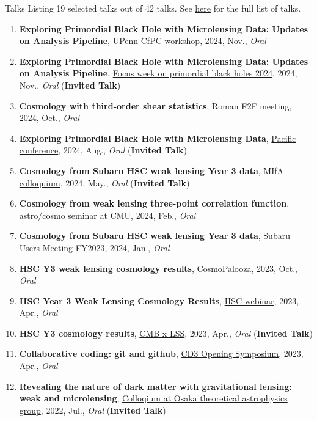 \begin{rSection}{Talks}
Listing 19 selected talks out of 42 talks.
See \href{https://github.com/git-sunao/cv/blob/main/en/sunao_type_list.pdf}{here} for the full list of talks.\begin{enumerate}
\item \textbf{Exploring Primordial Black Hole with Microlensing Data: Updates on Analysis Pipeline}, UPenn CfPC workshop, 2024, Nov., \textit{Oral}
\item \textbf{Exploring Primordial Black Hole with Microlensing Data: Updates on Analysis Pipeline}, \href{https://indico.ipmu.jp/event/439/overview}{Focus week on primordial black holes 2024}, 2024, Nov., \textit{Oral} (\textbf{Invited Talk})
\item \textbf{Cosmology with third-order shear statistics}, Roman F2F meeting, 2024, Oct., \textit{Oral}
\item \textbf{Exploring Primordial Black Hole with Microlensing Data}, \href{https://pacific-conference.pa.ucla.edu/index.html}{Pacific conference}, 2024, Aug., \textit{Oral} (\textbf{Invited Talk})
\item \textbf{Cosmology from Subaru HSC weak lensing Year 3 data}, \href{https://cse.umn.edu/physics/minnesota-institute-astrophysics-mifa-colloquium}{MIfA colloquium}, 2024, May., \textit{Oral} (\textbf{Invited Talk})
\item \textbf{Cosmology from weak lensing three-point correlation function}, astro/cosmo seminar at CMU, 2024, Feb., \textit{Oral}
\item \textbf{Cosmology from Subaru HSC weak lensing Year 3 data}, \href{https://www.subarutelescope.org/Science/SubaruUM/SubaruUM2023/index.html}{Subaru Users Meeting FY2023}, 2024, Jan., \textit{Oral}
\item \textbf{HSC Y3 weak lensing cosmology results}, \href{http://vietnam.in2p3.fr/2023/windows/index.html}{CosmoPalooza}, 2023, Oct., \textit{Oral}
\item \textbf{HSC Year 3 Weak Lensing Cosmology Results}, \href{https://hsc-release.mtk.nao.ac.jp/doc/index.php/wly3/}{HSC webinar}, 2023, Apr., \textit{Oral}
\item \textbf{HSC Y3 cosmology results}, \href{https://www2.yukawa.kyoto-u.ac.jp/~cmb-lss/index.php}{CMB x LSS}, 2023, Apr., \textit{Oral} (\textbf{Invited Talk})
\item \textbf{Collaborative coding: git and github}, \href{https://cd3.ipmu.jp/opening/}{CD3 Opening Symposium}, 2023, Apr., \textit{Oral}
\item \textbf{Revealing the nature of dark matter with gravitational lensing: weak and microlensing}, \href{http://astro-osaka.jp/OUTAP/colloquium-abstracts.html#sugiyama}{Colloqium at Osaka theoretical astrophysics group}, 2022, Jul., \textit{Oral} (\textbf{Invited Talk})

\end{enumerate}
\end{rSection}

